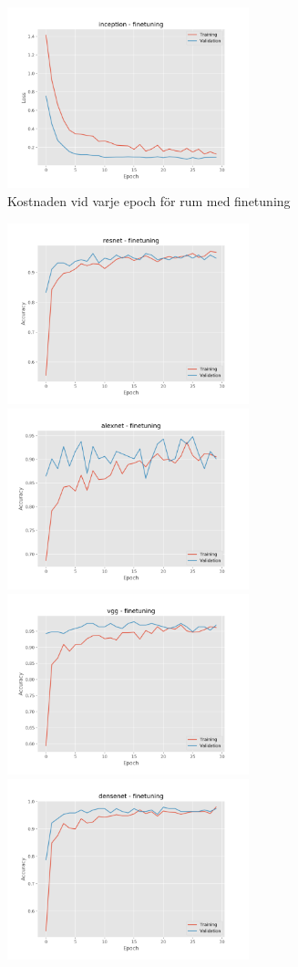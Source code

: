 \documentclass[]{kththesis}
\begin{document}
\begin{figure}[h]
    \includegraphics[width=7cm]{r_l_inception_fine}
    \caption{Kostnaden vid varje epoch för rum med finetuning}
    \label{fig:r_l_2}
  \end{figure}
  
  \begin{figure}[h]
    \includegraphics[width=7cm]{r_a_resnet_fine}
    \includegraphics[width=7cm]{r_a_alexnet_fine}
    \includegraphics[width=7cm]{r_a_vgg_fine}
    \includegraphics[width=7cm]{r_a_densenet_fine}

\end{figure}
\end{document}
